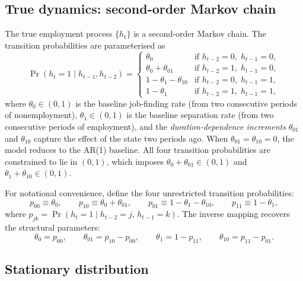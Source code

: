 \documentclass[12pt]{article}
\begin{document}
\subsection{True dynamics: second-order Markov chain}
\label{sec:ar2_dynamics}

The true employment process $\{h_t\}$ is a second-order Markov chain.
The transition probabilities are parameterised as
\begin{equation}
\Pr(h_t = 1 \mid h_{t-1}, h_{t-2}) =
\begin{cases}
\theta_0                          & \text{if } h_{t-2} = 0,\; h_{t-1} = 0, \\
\theta_0 + \theta_{01}            & \text{if } h_{t-2} = 1,\; h_{t-1} = 0, \\
1 - \theta_1 - \theta_{10}        & \text{if } h_{t-2} = 0,\; h_{t-1} = 1, \\
1 - \theta_1                      & \text{if } h_{t-2} = 1,\; h_{t-1} = 1,
\end{cases}
\label{eq:ar2_transitions}
\end{equation}
where $\theta_0 \in (0,1)$ is the baseline job-finding rate (from
two consecutive periods of nonemployment), $\theta_1 \in (0,1)$ is the
baseline separation rate (from two consecutive periods of employment),
and the \emph{duration-dependence increments} $\theta_{01}$ and
$\theta_{10}$ capture the effect of the state two periods ago. When
$\theta_{01} = \theta_{10} = 0$, the model reduces to the AR(1)
baseline. All four transition probabilities are constrained to lie in
$(0,1)$, which imposes $\theta_0 + \theta_{01} \in (0,1)$ and
$\theta_1 + \theta_{10} \in (0,1)$.

For notational convenience, define the four unrestricted transition
probabilities:
\begin{equation}
p_{00} \equiv \theta_0, \qquad
p_{10} \equiv \theta_0 + \theta_{01}, \qquad
p_{01} \equiv 1 - \theta_1 - \theta_{10}, \qquad
p_{11} \equiv 1 - \theta_1,
\label{eq:p_from_theta}
\end{equation}
where $p_{jk} = \Pr(h_t = 1 \mid h_{t-2} = j,\, h_{t-1} = k)$. The
inverse mapping recovers the structural parameters:
\begin{equation}
\theta_0 = p_{00}, \qquad
\theta_{01} = p_{10} - p_{00}, \qquad
\theta_1 = 1 - p_{11}, \qquad
\theta_{10} = p_{11} - p_{01}.
\label{eq:theta_from_p}
\end{equation}

\subsection{Stationary distribution}
\label{sec:stationary}
\end{document}
